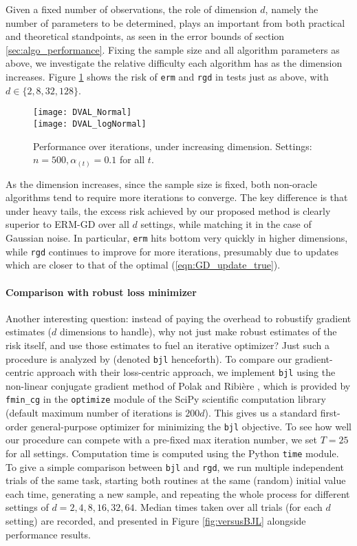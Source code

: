 \documentclass[11pt,oneside]{article}
\theoremstyle{definition} \newtheorem{defn}{Definition}       %
\theoremstyle{plain} \newtheorem{prop}[defn]{Proposition}           %
\theoremstyle{plain} \newtheorem{thm}[defn]{Theorem}                %
\theoremstyle{plain} \newtheorem{lem}[defn]{Lemma}                  %
\theoremstyle{plain} \newtheorem{cor}[defn]{Corollary}              %
\theoremstyle{remark} \newtheorem{rmk}[defn]{Remark}                %
\theoremstyle{remark} \newtheorem{ex}[defn]{Example}                %
\begin{document}
Given a fixed number of observations, the role of dimension $d$, namely the number of parameters to be determined, plays an important from both practical and theoretical standpoints, as seen in the error bounds of section \ref{sec:algo_performance}. Fixing the sample size and all algorithm parameters as above, we investigate the relative difficulty each algorithm has as the dimension increases. Figure \ref{fig:DVAL} shows the risk of \texttt{erm} and \texttt{rgd} in tests just as above, with $d \in \{2, 8, 32, 128\}$.

\begin{figure}[t]
\centering
\texttt{[image: DVAL\_Normal]}\\
\texttt{[image: DVAL\_logNormal]}
\caption{Performance over iterations, under increasing dimension. Settings: $n = 500, \alpha_{(t)}=0.1$ for all $t$.}
\label{fig:DVAL}
\end{figure}

As the dimension increases, since the sample size is fixed, both non-oracle algorithms tend to require more iterations to converge. The key difference is that under heavy tails, the excess risk achieved by our proposed method is clearly superior to ERM-GD over all $d$ settings, while matching it in the case of Gaussian noise. In particular, \texttt{erm} hits bottom very quickly in higher dimensions, while \texttt{rgd} continues to improve for more iterations, presumably due to updates which are closer to that of the optimal (\ref{eqn:GD_update_true}).


\paragraph{Comparison with robust loss minimizer}

Another interesting question: instead of paying the overhead to robustify gradient estimates ($d$ dimensions to handle), why not just make robust estimates of the risk itself, and use those estimates to fuel an iterative optimizer? Just such a procedure is analyzed by \citet{brownlees2015a} (denoted \texttt{bjl} henceforth). To compare our gradient-centric approach with their loss-centric approach, we implement \texttt{bjl} using the non-linear conjugate gradient method of Polak and Ribi\`{e}re \citep{nocedal1999a}, which is provided by \texttt{fmin\_cg} in the \texttt{optimize} module of the SciPy scientific computation library (default maximum number of iterations is $200d$). This gives us a standard first-order general-purpose optimizer for minimizing the \texttt{bjl} objective. To see how well our procedure can compete with a pre-fixed max iteration number, we set $T=25$ for all settings. Computation time is computed using the Python \texttt{time} module. To give a simple comparison between \texttt{bjl} and \texttt{rgd}, we run multiple independent trials of the same task, starting both routines at the same (random) initial value each time, generating a new sample, and repeating the whole process for different settings of $d = 2, 4, 8, 16, 32, 64$. Median times taken over all trials (for each $d$ setting) are recorded, and presented in Figure \ref{fig:versusBJL} alongside performance results.
\end{document}
